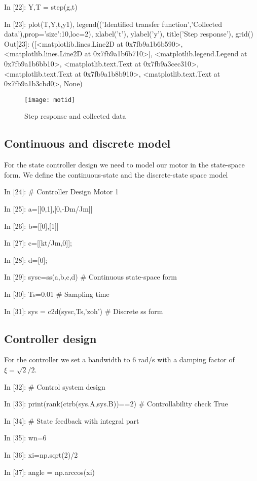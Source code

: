 \begin{code}
In [22]: Y,T = step(g,t)

In [23]: plot(T,Y,t,y1), legend(('Identified transfer function','Collected 
data'),prop={'size':10},loc=2), xlabel('t'), ylabel('y'), title('Step 
response'), grid()
Out[23]: 
([<matplotlib.lines.Line2D at 0x7fb9a1b6b590>,
  <matplotlib.lines.Line2D at 0x7fb9a1b6b710>],
 <matplotlib.legend.Legend at 0x7fb9a1b6bb10>,
 <matplotlib.text.Text at 0x7fb9a3cec310>,
 <matplotlib.text.Text at 0x7fb9a1b8b910>,
 <matplotlib.text.Text at 0x7fb9a1b3cbd0>,
 None)
\end{code}

\begin{figure}[htbp]	%
\centering
\texttt{[image: motid]}
\caption{Step response and collected data}
\label{F15}
\end{figure}

\subsection{Continuous and discrete model}
For the state controller design we need to model our motor in the state-space 
form. We define the continuous-state and the discrete-state space model

\begin{code}
In [24]: # Controller Design Motor 1

In [25]: a=[[0,1],[0,-Dm/Jm]]

In [26]: b=[[0],[1]]

In [27]: c=[[kt/Jm,0]];

In [28]: d=[0];

In [29]: sysc=ss(a,b,c,d)                # Continuous state-space form

In [30]: Ts=0.01                         # Sampling time

In [31]: sys = c2d(sysc,Ts,'zoh')        # Discrete ss form
\end{code}

\subsection{Controller design}
For the controller we set a bandwidth to $6$ rad/s with a damping factor of
$\xi=\sqrt{2}/2$.

\begin{code}

In [32]: # Control system design

In [33]: print(rank(ctrb(sys.A,sys.B))==2)    # Controllability check
True

In [34]: # State feedback with integral part

In [35]: wn=6

In [36]: xi=np.sqrt(2)/2

In [37]: angle = np.arccos(xi)
\end{code}


